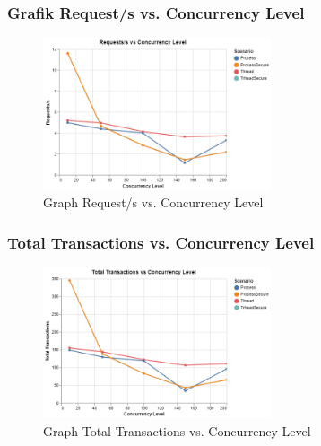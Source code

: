 \documentclass[12pt]{article}
\begin{document}
\subsubsection{Grafik Request/s vs. Concurrency Level}
\begin{figure}[h!]
 
    \includegraphics[width=0.6\textwidth]{res/request.png}
    \caption{Graph Request/s vs. Concurrency Level}
    \label{fig:arch}
    \end{figure}

\subsubsection{Total Transactions vs. Concurrency Level}
\begin{figure}[h!]

\includegraphics[width=0.6\textwidth]{res/transaction.png}
\caption{Graph Total Transactions vs. Concurrency Level}
\label{fig:arch}
\end{figure}
\end{document}
